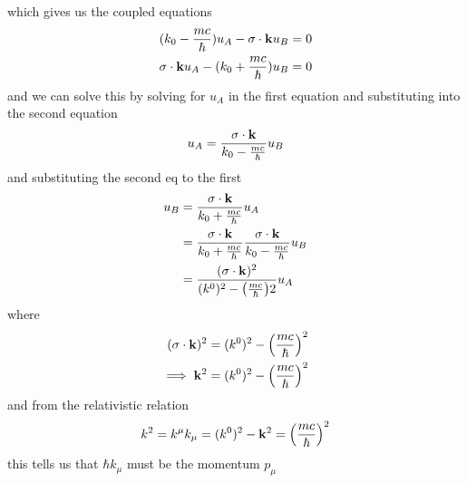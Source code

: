 \documentclass[../main.tex]{subfiles}
\begin{document}
which gives us the coupled equations
\begin{align*}
    (k_0 - \frac{mc}{\hbar}) u_A - \vb \sigma \cdot \vb k u_B = 0 \\
    \vb \sigma \cdot \vb k u_A - (k_0 + \frac{mc}{\hbar}) u_B = 0
\end{align*}
and we can solve this by solving for $u_A$ in the first equation and substituting into the second equation
\begin{align*}
    u_A = \frac{\vb \sigma \cdot \vb k}{k_0 - \frac{mc}{\hbar}} u_B
\end{align*}
and substituting the second eq to the first
\begin{align*}
    u_B &=  \frac{\sigma \cdot \vb k}{k_0 + \frac{mc}{\hbar}} u_A \\
    &= \frac{\sigma \cdot \vb k}{k_0 + \frac{mc}{\hbar}} \frac{\vb \sigma \cdot \vb k}{k_0 - \frac{mc}{\hbar}} u_B \\
    &= \frac{(\vb \sigma \cdot \vb k)^2}{(k^0)^2 - \qt(\frac{mc}{\hbar})2} u_A
\end{align*}
where
\begin{align*}
    (\vb \sigma \cdot \vb k)^2 = (k^0)^2 - \qt(\frac{mc}{\hbar})^2 \\
    \implies \vb k^2 = (k^0)^2 - \qt(\frac{mc}{\hbar})^2
\end{align*}
and from the relativistic relation
\begin{align*}
    k^2 = k^\mu k_\mu = (k^0)^2 - \vb k^2 = \qt(\frac{mc}{\hbar})^2
\end{align*}
this tells us that $\hbar k_\mu$ must be the momentum $p_\mu$

\newpage
{}
\end{document}
